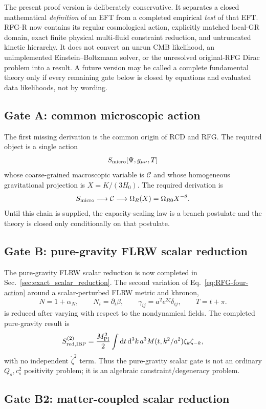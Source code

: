 \documentclass[11pt,a4paper]{article}
\newcommand{\C}{\mathcal{C}}
\renewcommand{\dd}{\mathrm{d}}
\newcommand{\mpl}{M_{\rm Pl}}
\begin{document}
The present proof version is deliberately conservative. It separates a closed mathematical \emph{definition} of an EFT from a completed empirical \emph{test} of that EFT. RFG-R now contains its regular cosmological action, explicitly matched local-GR domain, exact finite physical multi-fluid constraint reduction, and untruncated kinetic hierarchy. It does not convert an unrun CMB likelihood, an unimplemented Einstein--Boltzmann solver, or the unresolved original-RFG Dirac problem into a result. A future version may be called a complete fundamental theory only if every remaining gate below is closed by equations and evaluated data likelihoods, not by wording.

\subsection{Gate A: common microscopic action}

The first missing derivation is the common origin of RCD and RFG. The required object is a single action
\[
S_{\rm micro}[\Psi,g_{\mu\nu},T]
\]
whose coarse-grained macroscopic variable is \(\C\) and whose homogeneous gravitational projection is \(X=K/(3H_0)\). The required derivation is
\[
S_{\rm micro}
\longrightarrow
\C
\longrightarrow
\Omega_R(X)=\Omega_{R0}X^{-\theta}.
\]
Until this chain is supplied, the capacity-scaling law is a branch postulate and the theory is closed only conditionally on that postulate.

\subsection{Gate B: pure-gravity FLRW scalar reduction}

The pure-gravity FLRW scalar reduction is now completed in Sec.~\ref{sec:exact_scalar_reduction}. The second variation of Eq.~\eqref{eq:RFG-four-action} around a scalar-perturbed FLRW metric and khronon,
\[
N=1+\alpha_N,\qquad
N_i=\partial_i\beta,\qquad
\gamma_{ij}=a^2e^{2\zeta}\delta_{ij},\qquad
T=t+\pi.
\]
is reduced after varying with respect to the nondynamical fields. The completed pure-gravity result is
\[
S_{\rm red,IBP}^{(2)}
=
\frac{\mpl^2}{2}
\int\dd t\,\dd^3k\,a^3
M(t,k^2/a^2)\zeta_k\zeta_{-k},
\]
with no independent \(\dot\zeta^2\) term. Thus the pure-gravity scalar gate is not an ordinary \(Q_s,c_s^2\) positivity problem; it is an algebraic constraint/degeneracy problem.

\subsection{Gate B2: matter-coupled scalar reduction}
\end{document}
